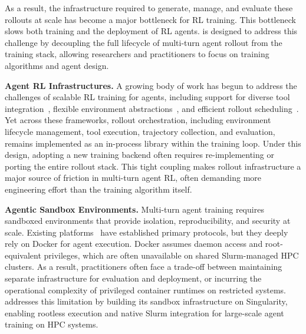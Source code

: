 As a result, the infrastructure required to generate, manage, and evaluate these rollouts at scale has become a major bottleneck for RL training.
This bottleneck slows both training and the deployment of RL agents. \prorlagent is designed to address this challenge by decoupling the full lifecycle of multi-turn agent rollout from the training stack, allowing researchers and practitioners to focus on training algorithms and agent design.

\textbf{Agent RL Infrastructures.}
A growing body of work has begun to address the challenges of scalable RL training for agents, including support for diverse tool integration~\citep{jiang2025verltool, li2025torl}, flexible environment abstractions~\citep{liu2025gem, tan2025rllm}, and efficient rollout scheduling~\citep{cao2025skyrlagent}.
Yet across these frameworks, rollout orchestration, including environment lifecycle management, tool execution, trajectory collection, and evaluation, remains implemented as an in-process library within the training loop. 
Under this design, adopting a new training backend often requires re-implementing or porting the entire rollout stack. This tight coupling makes rollout infrastructure a major source of friction in multi-turn agent RL, often demanding more engineering effort than the training algorithm itself.

\textbf{Agentic Sandbox Environments.}
Multi-turn agent training requires sandboxed environments that provide isolation, reproducibility, and security at scale.
Existing platforms~\citep{wang2024openhands, jimenez2024swebench, jain2025r2egym, yang2024sweagent} have established primary protocols, but they deeply rely on Docker for agent execution.
Docker assumes daemon access and root-equivalent privileges, which are often unavailable on shared Slurm-managed HPC clusters. 
As a result, practitioners often face a trade-off between maintaining separate infrastructure for evaluation and deployment, or incurring the operational complexity of privileged container runtimes on restricted systems.
\prorlagent addresses this limitation by building its sandbox infrastructure on Singularity, enabling rootless execution and native Slurm integration for large-scale agent training on HPC systems.
